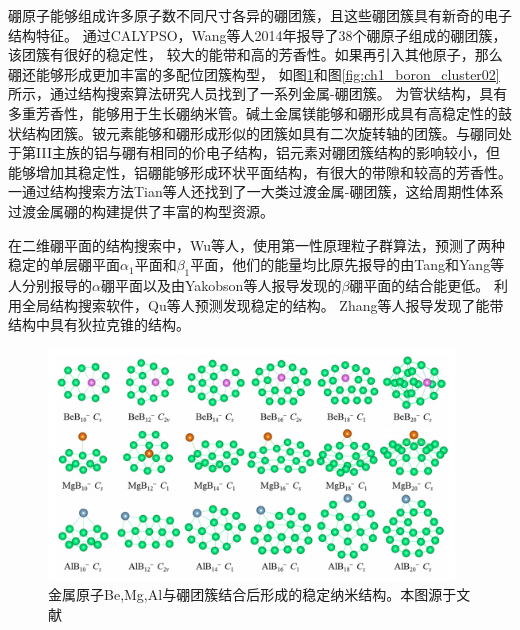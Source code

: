 硼原子能够组成许多原子数不同尺寸各异的硼团簇，且这些硼团簇具有新奇的电子结构特征。
通过CALYPSO，Wang等人\cite{lv2014b38}2014年报导了38个硼原子组成的硼团簇，该团簇有很好的稳定性，
较大的能带和高的芳香性。如果再引入其他原子，那么硼还能够形成更加丰富的多配位团簇构型\cite{lv2015stabilization}，
如图\ref{fig:ch1_boron_cluster01}和图\ref{fig:ch1_boron_cluster02}所示，通过结构搜索算法研究人员找到了一系列金属-硼团簇。
\cite{dong2019li}为管状结构，具有多重芳香性，能够用于生长硼纳米管。碱土金属镁能够和硼形成具有高稳定性的鼓状结构团簇\cite{tian2019exhaustive}。铍元素能够和硼形成形似的团簇如具有二次旋转轴的团簇\cite{kang2019probing}。与硼同处于第III主族的铝与硼有相同的价电子结构，铝元素对硼团簇结构的影响较小，但能够增加其稳定性，铝硼能够形成环状平面结构\cite{jin2019structural}，有很大的带隙和较高的芳香性。
一通过结构搜索方法Tian等人\cite{tian2019cluster}还找到了一大类过渡金属-硼团簇，这给周期性体系过渡金属硼的构建提供了丰富的构型资源。

在二维硼平面的结构搜索中，Wu等人\cite{wu2012two}，使用第一性原理粒子群算法，预测了两种稳定的单层硼平面$\alpha_1$平面和$\beta_1$平面，他们的能量均比原先报导的由Tang和Yang等人\cite{tang2007novel,yang2008ab}分别报导的$\alpha$硼平面以及由Yakobson等人\cite{penev2012polymorphism}报导发现的$\beta$硼平面的结合能更低。
利用全局结构搜索软件，Qu等人\cite{qu2017two}预测发现稳定的结构。
Zhang等人\cite{zhang2017dirac}报导发现了能带结构中具有狄拉克锥的结构。

\begin{figure}[bt]
  \includegraphics[width=0.96\textwidth]{figs/ch1_boron_cluster01.png}
  \centering
  \caption{金属原子Be,Mg,Al与硼团簇结合后形成的稳定纳米结构。本图源于文献\cite{tian2019cluster}}
  \label{fig:ch1_boron_cluster01}
\end{figure}

